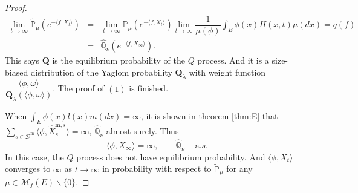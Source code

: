 \documentclass[12pt,a4paper]{amsart}
\numberwithin{equation}{section}
\theoremstyle{plain}
\theoremstyle{definition}
\theoremstyle{remark}
\begin{document}
\begin{proof}
\begin{eqnarray*}
\lim_{t\rightarrow\infty}\widetilde{\mathbb P}_\mu\left(e^{-\langle f, X_t\rangle}\right)&=&\lim_{t\rightarrow\infty}\mathbb P_\mu\left(e^{-\langle f, X_t\rangle}\right)
\lim_{t\to\infty}\dfrac{1}{\mu(\phi)}\int_E\phi(x)H(x, t)\mu(dx)=q(f)\\
&=&\widehat{\mathbb Q}_{\nu}\left(e^{-\langle f, X_{\infty}\rangle }\right).
\end{eqnarray*}
This says $\mathbf Q$ is the equilibrium probability of the $Q$ process.  And it is a size-biased distribution of the Yaglom probability $\mathbf Q_\lambda$ with weight function $\dfrac{\langle\phi,\omega\rangle}{\mathbf Q_\lambda(\langle\phi,\omega\rangle)}$.  The proof of $(1)$ is finished.


When $\int_E\hat\phi(x)l(x)m(dx)=\infty$, it is shown in theorem \ref{thm:E} that
 $\sum_{s\in\mathcal D^{\mathrm m}} \langle \phi,\widehat X^{{\mathrm m},s}_s\rangle =\infty$, $\widehat{\mathbb Q}_\nu$ almost surely. Thus
\[
\langle \phi, X_{\infty}\rangle =\infty,\qquad \widehat{\mathbb Q}_\nu-{\mathrm a.s.}
\]
In this case, the $Q$ process does not have equilibrium probability. And $\langle \phi, X_t\rangle $ converges to $\infty$ as $t\to\infty$ in probability with respect to $\widetilde{\mathbb P}_\mu$ for any $\mu\in \mathcal M_f(E)\backslash\{0\}$.
\end{proof}
\end{document}
